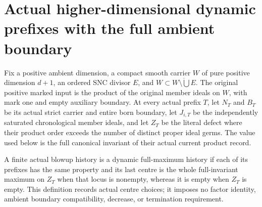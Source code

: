 \section{Actual higher-dimensional dynamic prefixes with the full ambient boundary}

Fix a positive ambient dimension, a compact smooth carrier $W$ of pure
positive dimension $d+1$, an ordered SNC divisor $E$, and
$W\subset\overline{W\setminus\bigcup E}$.  The original positive marked
input is the product of the original member ideals on $W$, with mark one
and empty auxiliary boundary.  At every actual prefix $T$, let $N_T$ and
$B_T$ be its actual strict carrier and entire born boundary, let $J_{i,T}$
be the independently saturated chronological member ideals, and let
$Z_T$ be the literal defect where their product order exceeds the number
of distinct proper ideal germs.  The value used below is the full
canonical invariant of their actual current product record.

\begin{definition}
\label{hir:sharp-actual-dynamic-full-maximum-history}
\leanok
A finite actual blowup history is a dynamic full-maximum history if each
of its prefixes has the same property and its last centre is the whole
full-invariant maximum on $Z_T$ when that locus is nonempty, whereas it
is empty when $Z_T$ is empty.  This definition records actual centre
choices; it imposes no factor identity, ambient boundary compatibility,
decrease, or termination requirement.
\end{definition}

